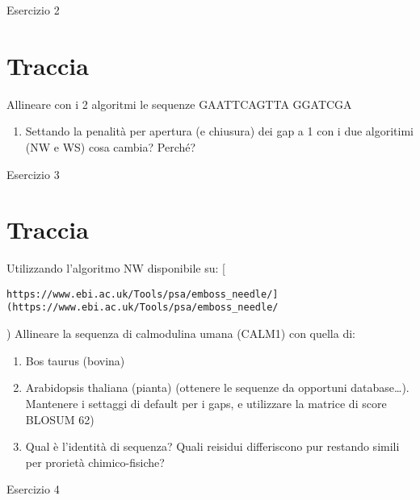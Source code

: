 \documentclass{article}
\begin{document}
\begin{center}
   \huge
   Esercizio 2
\end{center}
\section*{Traccia}
Allineare con i 2 algoritmi le sequenze
GAATTCAGTTA
GGATCGA
\begin{enumerate}
   \item Settando la penalità per apertura (e chiusura) dei gap a 1 con i due algoritimi (NW e WS) cosa cambia? Perché?
\end{enumerate}

\begin{center}
   \huge
   Esercizio 3
\end{center}
\section*{Traccia}
Utilizzando l’algoritmo NW disponibile su: [\begin{verbatim}https://www.ebi.ac.uk/Tools/psa/emboss_needle/](https://www.ebi.ac.uk/Tools/psa/emboss_needle/\end{verbatim})
Allineare la sequenza di calmodulina umana (CALM1) con quella di:
\begin{enumerate}
   \item Bos taurus (bovina)
   \item Arabidopsis thaliana (pianta) (ottenere le sequenze da opportuni database…).
      \subitem Mantenere i settaggi di default per i gaps, e utilizzare la matrice di score BLOSUM 62)
   \item Qual è l’identità di sequenza? Quali reisidui differiscono pur restando simili per prorietà chimico-fisiche?
\end{enumerate}

\begin{center}
   \huge
   Esercizio 4
\end{center}
\end{document}
